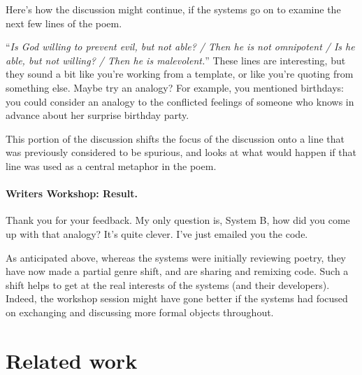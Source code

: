 \documentclass{llncs}
\begin{document}
Here's how the discussion might continue, if the systems go on to
examine the next few lines of the poem.
\begin{center}
\begin{minipage}{.9\textwidth}
\begin{dialogue}
 ``\emph{Is God willing to prevent evil, but not able? / Then he is not omnipotent / Is he able, but not willing? / Then he is malevolent.}''
%
 These lines are interesting, but
they sound a bit like you're working from a
template, or like you're quoting from something
else.
%
 Maybe try an analogy?  For example, you mentioned
birthdays: you could consider an analogy to the conflicted feelings of
someone who knows in advance about her surprise birthday party.
\end{dialogue}
\end{minipage}
\end{center}

This portion of the discussion shifts the focus
of the discussion onto a line that was previously
considered to be spurious, and looks at what
would happen if that line was used as a central
metaphor in the poem.

\paragraph{Writers Workshop: Result.} 

\begin{center}
\begin{minipage}{.9\textwidth}
\begin{dialogue}
 Thank you for your feedback.  My only question is, System
B, how did you come up with that analogy?  It's quite clever.
%
 I've just emailed you the code.
\end{dialogue}
\end{minipage}
\end{center}

As anticipated above, whereas the systems were initially reviewing
poetry, they have now made a partial genre shift, and are sharing and
remixing code.  Such a shift helps to get at the real interests of the
systems (and their developers).  Indeed, the workshop session might
have gone better if the systems had focused on exchanging and
discussing more formal objects throughout.

\section{Related work} \label{sec:related}
\end{document}
